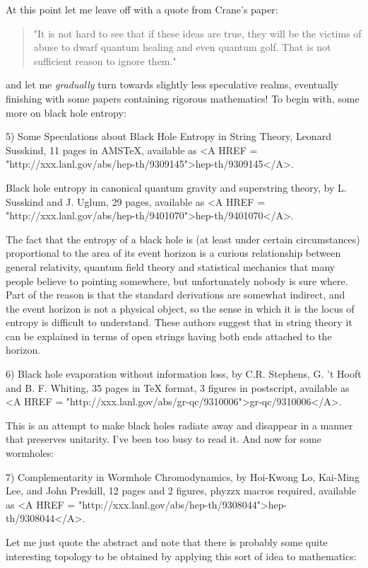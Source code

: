 At this point let me leave off with a quote from Crane's paper:

\begin{quote}
"It is not hard to see that if these ideas are true, they will be the
victims of abuse to dwarf quantum healing and even quantum golf. That
is not sufficient reason to ignore them."
\end{quote}

and let me \emph{gradually} turn towards slightly less speculative realms,
eventually finishing with some papers containing rigorous mathematics!
To begin with, some more on black hole entropy:

5)  Some Speculations about Black Hole Entropy in String Theory,
Leonard Susskind, 11 pages in AMSTeX, available as <A HREF = "http://xxx.lanl.gov/abs/hep-th/9309145">hep-th/9309145</A>.

Black hole entropy in canonical quantum gravity and superstring
theory, by L. Susskind and J. Uglum, 29 pages, available as <A HREF = "http://xxx.lanl.gov/abs/hep-th/9401070">hep-th/9401070</A>.

The fact that the entropy of a black hole is (at least under certain
circumstances) proportional to the area of its event horizon is a
curious relationship between general relativity, quantum field theory
and statistical mechanics that many people believe to pointing
somewhere, but unfortunately nobody is sure where.  Part of the reason
is that the standard derivations are somewhat indirect, and the event
horizon is not a physical object, so the sense in which it is the locus
of entropy is difficult to understand.  These authors suggest that in
string theory it can be explained in terms of open strings having both
ends attached to the horizon.  

6) Black hole evaporation without information loss, by C.R. Stephens, G.
't Hooft and B. F. Whiting, 35 pages in TeX format, 3 figures in
postscript, available as <A HREF = "http://xxx.lanl.gov/abs/gr-qc/9310006">gr-qc/9310006</A>.  

This is an attempt to make black holes radiate away and disappear
in a manner that preserves unitarity.  I've been too busy to read it.
And now for some wormholes:

7) Complementarity in Wormhole Chromodynamics, by Hoi-Kwong Lo, Kai-Ming
Lee, and John Preskill, 12 pages and 2 figures, phyzzx macros required,
available as <A HREF = "http://xxx.lanl.gov/abs/hep-th/9308044">hep-th/9308044</A>.

Let me just quote the abstract and note that there is probably some quite
interesting topology to be obtained by applying this sort of idea to
mathematics:

